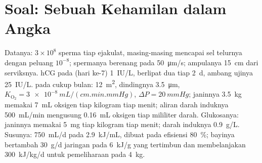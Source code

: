 \section{Soal: Sebuah Kehamilan dalam Angka}

\begin{problem}
\label{pb:b2:mammal-reproduction:1}
Datanya: $3\times 10^{8}$ sperma tiap ejakulat, masing-masing mencapai
sel telurnya dengan peluang $10^{-8}$; spermanya berenang pada
\qty{50}{\micro m/s}; ampulanya \qty{15}{cm} dari serviksnya. hCG pada
 (hari ke-7) \qty{1}{IU/L}, berlipat dua tiap \qty{2}{d},
ambang ujinya \qty{25}{IU/L}.  pada cukup bulan:
\qty{12}{m^2}, dindingnya \qty{3.5}{\micro m},
$K_{\mathrm{O_2}} = \qty{3e-8}{mL/(cm.min.mmHg)}$,
$\Delta P = \qty{20}{mmHg}$; janinnya \qty{3.5}{kg} memakai
\qty{7}{mL} oksigen tiap kilogram tiap menit; aliran darah 
induknya \qty{500}{mL/min} mengusung \qty{0.16}{mL} oksigen tiap
mililiter darah. Glukosanya: janinnya memakai \qty{5}{mg} tiap kilogram
tiap menit; darah induknya \qty{0.9}{g/L}. Susunya: \qty{750}{mL/d}
pada \qty{2.9}{kJ/mL}, dibuat pada efisiensi \qty{80}{\%}; bayinya
bertambah \qty{30}{g/d} jaringan pada \qty{6}{kJ/g} yang tertimbun dan
membelanjakan \qty{300}{kJ/kg/d} untuk pemeliharaan pada \qty{4}{kg}.


\end{problem}
